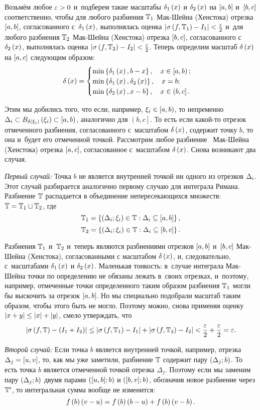 \documentclass[draft]{article}
\begin{document}
Возьмём любое $\varepsilon > 0$ и~подберем такие масштабы $\de_1\atx$ и
$\de_2\atx$ на $\seg[a,b]$ и~$\seg[b,c]$ соответственно, чтобы для
любого разбиения $\mathbb{T}_1$ Мак-Шейна (Хенстока) отрезка $\seg[a,b]$,
согласованного с~$\de_1\atx$, выполнялась оценка
$\abs{\isum(f,\T_1)-I_1}<{\ep\over2}$ и~для любого разбиения $\mathbb{T}_2$
Мак-Шейна (Хенстока) отрезка $\seg[b,c]$, согласованного с
$\de_2\atx$, выполнялась оценка
$\abs{\isum(f,\T_2)-I_2}<{\ep\over2}$. Теперь определим масштаб
$\dex$ на $\seg[a,c]$ следующим образом:
$$\dex=\begin{cases}\min \set{\de_1\atx,b-x},\quad x\in\left[a,b\right);\cr
\min \set{\de_1\atx,\de_2\atx},\quad x=b;\cr
\min \set{\de_2\atx,x-b},\quad
x\in\left(b,c\right].\cr\end{cases}$$

Этим мы добились того, что если, например,
$\xi_i\in\left[a,b\right)$, то непременно $\Delta_i\subset
B_{\delta\left(\xi_i\right)}  \left(\xi_i\right)\subset\left[a,b\right)$,
аналогично для $\left(b,c\right]$. То есть если какой-то отрезок
отмеченного разбиения, согласованного с~масштабом $\dex$, содержит
точку $b$, то она и~будет его отмеченной точкой. Рассмотрим любое
разбиение \Tdixif\ Мак-Шейна (Хенстока) отрезка $\seg[a,c]$,
согласованное с~масштабом $\dex$. Снова возникают два случая.

\medskip

{\sl Первый случай:} Точка $b$ не является внутренней точкой ни
одного из отрезков $\Delta_i$. Этот случай разбирается аналогично
первому случаю для интеграла Римана. Разбиение $\mathbb{T}$ распадается в
объединение непересекающихся множеств: $\mathbb{T}=\mathbb{T}_1\sqcup\mathbb{T}_2$, где
$$\T_1=\set{\dixi\in\T:\dei\subseteq\seg[a,b]},$$
$$\T_2=\set{\dixi\in\T:\dei\subseteq\seg[b,c]}.$$

Разбиения $\mathbb{T}_1$ и~$\mathbb{T}_2$ и~теперь являются разбиениями отрезков
$\seg[a,b]$ и~$\seg[b,c]$ Мак-Шейна (Хенстока), согласованными с
масштабом $\dex$, и, следовательно, с~масштабами $\de_1\atx$ и
$\de_2\atx$. Маленькая тонкость: в~случае интеграла Мак-Шейна точки
по определению не обязаны лежать в~своих отрезках, и~поэтому,
например, отмеченные точки определенного таким образом разбиения
$\mathbb{T}_1$ могли бы выскочить за отрезок $\seg[a,b]$. Но мы специально
подобрали масштаб таким образом, чтобы этого быть не могло. Поэтому
можно, снова применяя оценку $\left|x+y\right|\le\left|x\right|+\left|y\right|$, смело
утверждать, что
$$\abs{\isum(f,\T)-\left(I_1+I_2\right)}\le\abs{\isum(f,\T_1)-I_1}+
\abs{\isum(f,\T_2)-I_2}<{\ep\over2}+{\ep\over2}=\ep.$$

{\sl Второй случай:} Если точка $b$ является внутренней точкой,
например, отрезка $\Delta_j=\seg[u,v]$,  то, как мы уже заметили,
разбиение $\mathbb{T}$ содержит пару $\pair(\Delta_j;b)$. То есть точка $b$
является отмеченной точкой отрезка $\Delta_j$. Поэтому если мы
заменим пару $\pair(\Delta_j;b)$ двумя парами $\pair(\seg[u,b];b)$ и
$\pair(\seg[b,v];b)$, обозначив новое разбиение через $\mathbb{T}'$, то
интегральная сумма вообще не изменится:
$$f\at(b)\at(v-u)=f\at(b)\at(b-u)+f\at(b)\at(v-b).$$
\end{document}
